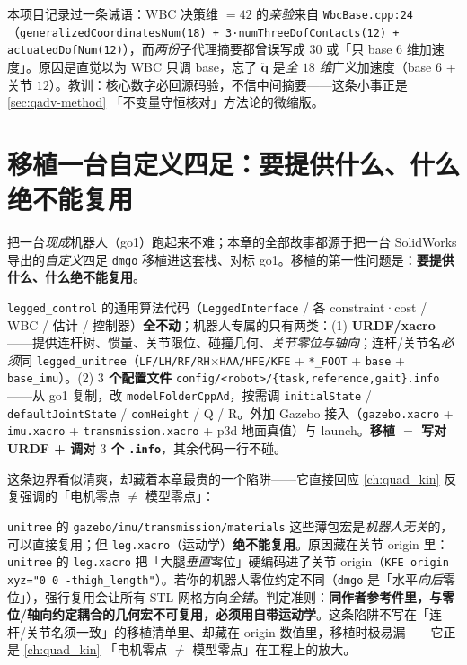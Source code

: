 \begin{pitfall}
本项目记录过一条诫语：WBC 决策维 $=42$ 的\emph{亲验}来自 \texttt{WbcBase.\allowbreak cpp:24}（\texttt{generalizedCoordinatesNum(18) + 3·numThreeDofContacts(12) + actuatedDofNum(12)}），而\emph{两份}子代理摘要都曾误写成 $30$ 或「只 base $6$ 维加速度」。原因是直觉以为 WBC 只调 base，忘了 $\ddot{\boldsymbol{q}}$ 是\emph{全 $18$ 维}广义加速度（base $6$ + 关节 $12$）。教训：核心数字必回源码验，不信中间摘要——这条小事正是 \cref{sec:qadv-method} 「不变量守恒核对」方法论的微缩版。
\end{pitfall}

\section{移植一台自定义四足：要提供什么、什么绝不能复用}
\label{sec:qadv-port}

把一台\emph{现成}机器人（go1）跑起来不难；本章的全部故事都源于把一台 SolidWorks 导出的\emph{自定义}四足 \texttt{dmgo} 移植进这套栈、对标 go1。移植的第一性问题是：\textbf{要提供什么、什么绝不能复用}。

\begin{insight}\label{ins:qadv-port-boundary}
\texttt{legged\_control} 的通用算法代码（\texttt{LeggedInterface} / 各 constraint·cost / WBC / 估计 / 控制器）\textbf{全不动}；机器人专属的只有两类：(1) \textbf{URDF/xacro}——提供连杆树、惯量、关节限位、碰撞几何、\emph{关节零位与轴向}；连杆/关节名\emph{必须}同 \texttt{legged\_unitree}（\texttt{LF/LH/RF/RH}$\times$\texttt{HAA/HFE/KFE} + \texttt{*\_FOOT} + \texttt{base} + \texttt{base\_imu}）。(2) \textbf{$3$ 个配置文件} \texttt{config/<robot>/\{task,reference,gait\}.info}——从 go1 复制，改 \texttt{modelFolderCppAd}，按需调 \texttt{initialState} / \texttt{defaultJointState} / \texttt{comHeight} / Q / R。外加 Gazebo 接入（\texttt{gazebo.\allowbreak xacro} + \texttt{imu.xacro} + \texttt{transmission.\allowbreak xacro} + p3d 地面真值）与 launch。\textbf{移植 $=$ 写对 URDF + 调对 $3$ 个 \texttt{.info}}，其余代码一行不碰。
\end{insight}

这条边界看似清爽，却藏着本章最贵的一个陷阱——它直接回应 \cref{ch:quad_kin} 反复强调的「电机零点 $\neq$ 模型零点」：

\begin{insight}\label{ins:qadv-leg-noreuse}
\texttt{unitree} 的 \texttt{gazebo/\allowbreak imu/\allowbreak transmission/\allowbreak materials} 这些薄包宏是\emph{机器人无关}的，可以直接复用；但 \texttt{leg.xacro}（运动学）\textbf{绝不能复用}。原因藏在关节 origin 里：\texttt{unitree} 的 \texttt{leg.xacro} 把「大腿\emph{垂直}零位」硬编码进了关节 origin（\texttt{KFE origin xyz="0 0 -thigh\_length"}）。若你的机器人零位约定不同（\texttt{dmgo} 是「水平\emph{向后}零位」），强行复用会让所有 STL 网格方向\emph{全错}。判定准则：\textbf{同作者参考件里，与零位/轴向约定耦合的几何宏不可复用，必须用自带运动学}。这条陷阱不写在「连杆/关节名须一致」的移植清单里、却藏在 origin 数值里，移植时极易漏——它正是 \cref{ch:quad_kin} 「电机零点 $\neq$ 模型零点」在工程上的放大。
\end{insight}

